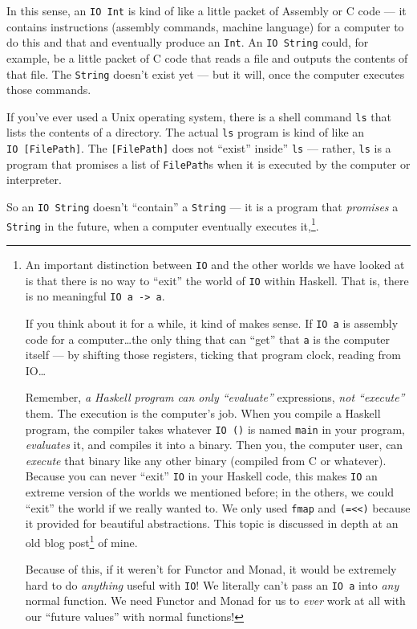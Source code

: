 \documentclass[]{article}
\renewcommand{\href}[2]{#2\footnote{\url{#1}}}
\begin{document}
In this sense, an \texttt{IO\ Int} is kind of like a little packet of Assembly
or C code --- it contains instructions (assembly commands, machine language) for
a computer to do this and that and eventually produce an \texttt{Int}. An
\texttt{IO\ String} could, for example, be a little packet of C code that reads
a file and outputs the contents of that file. The \texttt{String} doesn't exist
yet --- but it will, once the computer executes those commands.

If you've ever used a Unix operating system, there is a shell command
\texttt{ls} that lists the contents of a directory. The actual \texttt{ls}
program is kind of like an \texttt{IO\ {[}FilePath{]}}. The
\texttt{{[}FilePath{]}} does not ``exist'' inside'' \texttt{ls} --- rather,
\texttt{ls} is a program that promises a list of \texttt{FilePath}s when it is
executed by the computer or interpreter.

So an \texttt{IO\ String} doesn't ``contain'' a \texttt{String} --- it is a
program that \emph{promises} a \texttt{String} in the future, when a computer
eventually executes it,\footnote{An important distinction between \texttt{IO}
  and the other worlds we have looked at is that there is no way to ``exit'' the
  world of \texttt{IO} within Haskell. That is, there is no meaningful
  \texttt{IO\ a\ -\textgreater{}\ a}.

  If you think about it for a while, it kind of makes sense. If \texttt{IO\ a}
  is assembly code for a computer\ldots the only thing that can ``get'' that
  \texttt{a} is the computer itself --- by shifting those registers, ticking
  that program clock, reading from IO\ldots{}

  Remember, \emph{a Haskell program can only ``evaluate''} expressions,
  \emph{not ``execute''} them. The execution is the computer's job. When you
  compile a Haskell program, the compiler takes whatever \texttt{IO\ ()} is
  named \texttt{main} in your program, \emph{evaluates} it, and compiles it into
  a binary. Then you, the computer user, can \emph{execute} that binary like any
  other binary (compiled from C or whatever). Because you can never ``exit''
  \texttt{IO} in your Haskell code, this makes \texttt{IO} an extreme version of
  the worlds we mentioned before; in the others, we could ``exit'' the world if
  we really wanted to. We only used \texttt{fmap} and
  \texttt{(=\textless{}\textless{})} because it provided for beautiful
  abstractions. This topic is discussed in depth at an
  \href{http://blog.jle.im/entry/the-compromiseless-reconciliation-of-i-o-and-purity}{old
  blog post} of mine.

  Because of this, if it weren't for Functor and Monad, it would be extremely
  hard to do \emph{anything} useful with \texttt{IO}! We literally can't pass an
  \texttt{IO\ a} into \emph{any} normal function. We need Functor and Monad for
  us to \emph{ever} work at all with our ``future values'' with normal
  functions!}.
\end{document}
